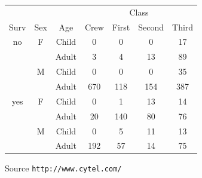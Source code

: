 \documentclass[a4paper]{article}
\begin{document}
\begin{appendix}
\begin{table}[H]
\begin{center}
  \begin{tabular}{ccc|cccc} \hline
     &     &       & \multicolumn{4}{c}{Class} \\
Surv & Sex & Age   & Crew  & First & Second & Third \\ \hline
no   & F   & Child &    0 &   0 &   0 &  17 \\
     &     & Adult &    3 &   4 &  13 &  89 \\
     & M   & Child &    0 &   0 &   0 &  35 \\
     &     & Adult &  670 & 118 & 154 & 387 \\
yes  & F   & Child &    0 &   1 &  13 &  14 \\ 
     &     & Adult &   20 & 140 &  80 &  76 \\ 
     & M   & Child &    0 &   5 &  11 &  13 \\
     &     & Adult &  192 &  57 &  14 &  75 \\
\hline
  \end{tabular}
  \label{tab:titanic}
\end{center}
Source \texttt{http://www.cytel.com/}
\end{table}
\end{appendix}
\end{document}
